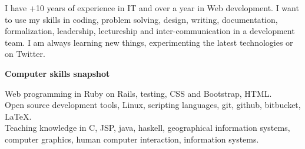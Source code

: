 I have +10 years of experience in IT and over a year in Web development. 
I want to use my skills in coding, problem solving, design, writing, 
documentation, formalization, leadership,
lectureship and inter-communication in a development team. 
I am always learning new things, experimenting the latest
technologies or on Twitter.


\thispagestyle{empty}

\vspace*{0.5cm}
\textbf{\large Computer skills snapshot} 

Web programming in Ruby on Rails, testing, CSS and Bootstrap, HTML.\\ 
Open source development tools, Linux, scripting languages, git,
github, bitbucket, \LaTeX. \\
Teaching knowledge in C, JSP, java, haskell, geographical information
systems, computer graphics, human computer interaction, 
information systems. \\



\vspace*{-0.5cm}


\vspace*{-0.3cm}


\vspace*{-0.5cm}


\vspace*{-0.3cm}
\subsection*{\titleOrganization}
\vspace*{-0.2cm}





